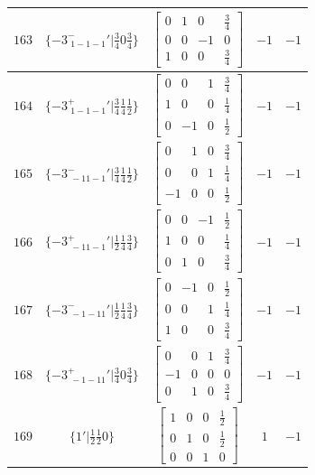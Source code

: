 \documentclass[fleqn,8pt]{jsarticle}
\begin{document}
\begin{longtable}{ccccc}
$ 163 $ & $ \{-3^{-}_{\,\,1-1-1}{}'|\frac{3}{4} 0 \frac{3}{4}\} $ & $ \begin{bmatrix} 0 & 1 & 0 & \frac{3}{4} \\ 0 & 0 & -1 & 0 \\ 1 & 0 & 0 & \frac{3}{4} \end{bmatrix} $ & $ -1 $ & $ -1 $ \\ \hline
$ 164 $ & $ \{-3^{+}_{\,\,1-1-1}{}'|\frac{3}{4} \frac{1}{4} \frac{1}{2}\} $ & $ \begin{bmatrix} 0 & 0 & 1 & \frac{3}{4} \\ 1 & 0 & 0 & \frac{1}{4} \\ 0 & -1 & 0 & \frac{1}{2} \end{bmatrix} $ & $ -1 $ & $ -1 $ \\ \hline
$ 165 $ & $ \{-3^{-}_{\,\,-11-1}{}'|\frac{3}{4} \frac{1}{4} \frac{1}{2}\} $ & $ \begin{bmatrix} 0 & 1 & 0 & \frac{3}{4} \\ 0 & 0 & 1 & \frac{1}{4} \\ -1 & 0 & 0 & \frac{1}{2} \end{bmatrix} $ & $ -1 $ & $ -1 $ \\ \hline
$ 166 $ & $ \{-3^{+}_{\,\,-11-1}{}'|\frac{1}{2} \frac{1}{4} \frac{3}{4}\} $ & $ \begin{bmatrix} 0 & 0 & -1 & \frac{1}{2} \\ 1 & 0 & 0 & \frac{1}{4} \\ 0 & 1 & 0 & \frac{3}{4} \end{bmatrix} $ & $ -1 $ & $ -1 $ \\ \hline
$ 167 $ & $ \{-3^{-}_{\,\,-1-11}{}'|\frac{1}{2} \frac{1}{4} \frac{3}{4}\} $ & $ \begin{bmatrix} 0 & -1 & 0 & \frac{1}{2} \\ 0 & 0 & 1 & \frac{1}{4} \\ 1 & 0 & 0 & \frac{3}{4} \end{bmatrix} $ & $ -1 $ & $ -1 $ \\ \hline
$ 168 $ & $ \{-3^{+}_{\,\,-1-11}{}'|\frac{3}{4} 0 \frac{3}{4}\} $ & $ \begin{bmatrix} 0 & 0 & 1 & \frac{3}{4} \\ -1 & 0 & 0 & 0 \\ 0 & 1 & 0 & \frac{3}{4} \end{bmatrix} $ & $ -1 $ & $ -1 $ \\ \hline
$ 169 $ & $ \{1{}'|\frac{1}{2} \frac{1}{2} 0\} $ & $ \begin{bmatrix} 1 & 0 & 0 & \frac{1}{2} \\ 0 & 1 & 0 & \frac{1}{2} \\ 0 & 0 & 1 & 0 \end{bmatrix} $ & $ 1 $ & $ -1 $ \\ \hline

\end{longtable}
\end{document}
